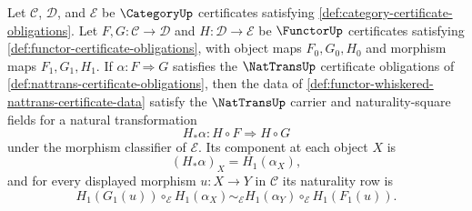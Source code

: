 \begin{theorem}
\label{thm:functor-whiskering-nattrans-certificate}
Let $\mathcal C$, $\mathcal D$, and $\mathcal E$ be $\CategoryUp$ certificates satisfying \autoref{def:category-certificate-obligations}. Let $F,G:\mathcal C\to\mathcal D$ and $H:\mathcal D\to\mathcal E$ be $\FunctorUp$ certificates satisfying \autoref{def:functor-certificate-obligations}, with object maps $F_0,G_0,H_0$ and morphism maps $F_1,G_1,H_1$. If $\alpha:F\Rightarrow G$ satisfies the $\NatTransUp$ certificate obligations of \autoref{def:nattrans-certificate-obligations}, then the data of \autoref{def:functor-whiskered-nattrans-certificate-data} satisfy the $\NatTransUp$ carrier and naturality-square fields for a natural transformation
$$
H_{\ast}\alpha:H\circ F\Rightarrow H\circ G
$$
under the morphism classifier of $\mathcal E$. Its component at each object $X$ is
$$
(H_{\ast}\alpha)_X=H_1(\alpha_X),
$$
and for every displayed morphism $u:X\to Y$ in $\mathcal C$ its naturality row is
$$
H_1(G_1(u))\circ_{\mathcal E}H_1(\alpha_X)
\sim_{\mathcal E}
H_1(\alpha_Y)\circ_{\mathcal E}H_1(F_1(u)).
$$
\end{theorem}
